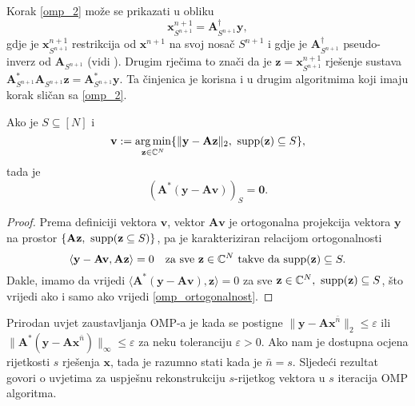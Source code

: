 \documentclass[a4paper,twoside,12pt]{memoir} %
\newcommand{\vect}[1]{\mathbf{#1}}
\renewcommand{\vec}{\vect}
\newcommand{\supp}{\text{\normalfont{supp}}}
\newcommand{\norm}[1]{\|{#1}\|}
\DeclareMathOperator*{\argmin}{arg\,min}
\begin{document}
Korak \eqref{omp_2} mo\v{z}e se prikazati u obliku
\begin{equation*}
    \vec{x}_{S^{n+1}}^{n+1} = \vec{A}_{S^{n+1}}^{\dagger}\vec y,
\end{equation*}
gdje je $\vec{x}_{S^{n+1}}^{n+1}$ restrikcija od $\vec x^{n+1}$ na svoj nosa\v{c} $S^{n+1}$ i gdje je $\vec A^{\dagger}_{S^{n+1}}$ pseudo-inverz od $\vec{A}_{S^{n+1}}$ (vidi \cite{penrose_1955}). Drugim rje\v{c}ima to zna\v{c}i da je $\vec z = \vec x ^{n+1}_{S^{n+1}}$ rje\v{s}enje sustava $\vec A^*_{S^{n+1}} \vec A_{S^{n+1}} \vec z = \vec A^*_{S^{n+1}} \vec y$. Ta \v{c}injenica je korisna i u drugim algoritmima koji imaju korak sli\v{c}an sa \eqref{omp_2}.
\begin{lem}\label{lem:3:4}
    Ako je $S \subseteq [N]$ i
    \begin{equation*}
        \vec v := \argmin_{\vec z \in \C^N} \{\norm{\vec y - \vec{Az}}_2,\ \supp(\vec z) \subseteq S\},
    \end{equation*}
    tada je
    \begin{equation}\label{omp_ortogonalnost}
        (\vec A^*(\vec y - \vec{Av}))_S = \vec 0.
    \end{equation}
\end{lem}
\begin{proof}
    Prema definiciji vektora $\vec v$, vektor $\vec{Av}$ je ortogonalna projekcija vektora $\vec y$ na prostor $\{\vec{Az},\ \supp(\vec{z} \subseteq S)\}$, pa je karakteriziran relacijom ortogonalnosti
    \begin{equation*}
        \langle \vec y - \vec{Av}, \vec{Az} \rangle = 0 \quad \text{za sve }\vec z \in \C^N \ \text{takve da } \supp(\vec z) \subseteq S.
    \end{equation*}
    Dakle, imamo da vrijedi $\langle \vec A^*( \vec y - \vec{Av}), \vec{z} \rangle = 0$ za sve $\vec z \in \C^N,\ \supp(\vec z) \subseteq S$, \v{s}to vrijedi ako i samo ako vrijedi \eqref{omp_ortogonalnost}.
\end{proof}

Prirodan uvjet zaustavljanja OMP-a je kada se postigne $\norm{\vec{y} - \vec{Ax}^{\bar{n}}}_2 \leq \varepsilon$ ili $\norm{\vec A^*(\vec y - \vec{Ax}^{\bar{n}})}_{\infty} \leq \varepsilon$ za neku toleranciju $\varepsilon > 0$. Ako nam je dostupna ocjena rijetkosti $s$ rje\v{s}enja $\vec x$, tada je razumno stati kada je $\bar{n} = s$. Sljede\'ci rezultat govori o uvjetima za uspje\v{s}nu rekonstrukciju $s$-rijetkog vektora u $s$ iteracija OMP algoritma.
\end{document}

